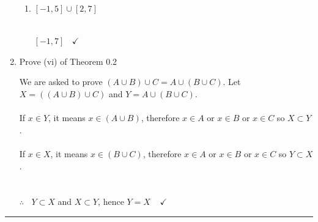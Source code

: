 \documentclass[fleqn]{article}
\begin{document}
\begin{enumerate}
\begin{enumerate}
      \item $[-1, 5] \cup [2, 7]$

        \textcolor{hwColor}{
          \\
          $
            [-1, 7] ~~~~ \checkmark
          $
          \\
        }

    \end{enumerate}

    \item Prove (vi) of Theorem 0.2
    
      \textcolor{hwColor}{
        We are asked to prove $(A \cup B) \cup C=A \cup (B \cup C)$. Let $X=((A \cup B) \cup C)$ and $Y=A \cup (B \cup C)$. 
        \\
        \\
        If $x \in Y$, it means $x \in (A \cup B)$, therefore $x \in A$ or $x \in B$ or $x \in C$ so $X \subset Y$.
        \\
        \\
        If $x \in X$, it means $x \in (B \cup C)$, therefore $x \in A$ or $x \in B$ or $x \in C$ so $Y \subset X$.
        \\
        \\
        \\
        $\therefore ~~~~ Y \subset X$ and $X \subset Y$, hence $Y=X ~~~~~ \checkmark$ 
      }

  \end{enumerate}

  \rule{15cm}{2pt}
\end{document}
